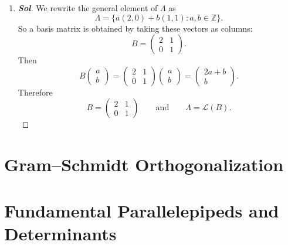 \begin{enumerate}
\begin{proof}[\normalfont\color{magenta}\bfseries Sol]
		Also,
		\[
		-\mathbf x
		=
		\sum_{i=1}^m (-z_i)\mathbf b_i.
		\]
		Since \(-z_i\in\mathbb Z\), it follows that \(-\mathbf x\in\Lambda\). Thus \(\Lambda\) is closed under negation.
		Therefore every lattice contains \(\mathbf 0\) and is closed under addition and negation.
	\end{proof}
	\item 
	\begin{proof}[\normalfont\color{magenta}\bfseries Sol]
		We rewrite the general element of \(\Lambda\) as 
		\[
		\Lambda=\{a(2,0)+b(1,1):a,b\in\mathbb Z\}.
		\]
		So a basis matrix is obtained by taking these vectors as columns:
		\[
		B=
		\begin{pmatrix}
			2 & 1\\
			0 & 1
		\end{pmatrix}.
		\]
		Then
		\[
		B\begin{pmatrix}a\\ b\end{pmatrix}
		=
		\begin{pmatrix}
			2 & 1\\
			0 & 1
		\end{pmatrix}
		\begin{pmatrix}
			a\\ b
		\end{pmatrix}
		=
		\begin{pmatrix}
			2a+b\\
			b
		\end{pmatrix}.
		\]
		Therefore
		\[
		\boxed{
			B=
			\begin{pmatrix}
				2 & 1\\
				0 & 1
			\end{pmatrix}
		}
		\qquad\text{and}\qquad
		\Lambda=\mathcal L(B).
		\]
	\end{proof}
\end{enumerate}

\section{Gram--Schmidt Orthogonalization}

\newpage
\section{Fundamental Parallelepipeds and Determinants}

